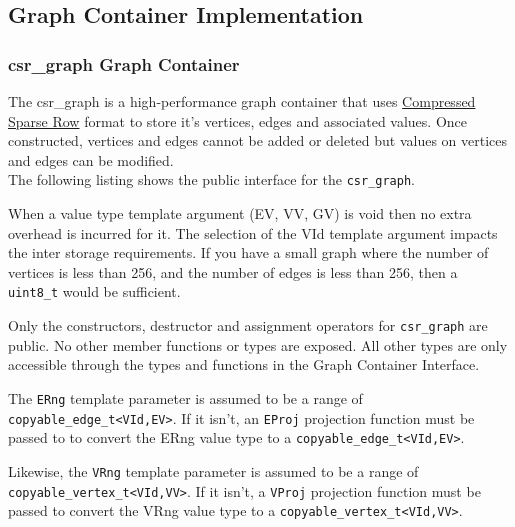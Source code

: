 \documentclass[10pt,onecolumn]{article}
\newcommand{\tcode}[1]{\lstinline[breaklines=true]{#1}}
\begin{document}
\subsection{Graph Container Implementation}

\subsubsection{csr\_graph Graph Container}
The csr\_graph is a high-performance graph container that uses \href{https://en.wikipedia.org/wiki/Sparse_matrix#Compressed_sparse_row_\%28CSR\%2C_CRS_or_Yale_format\%29}{Compressed Sparse Row} format to store it's vertices, edges and associated values. Once constructed, vertices and edges cannot be added or deleted but values on vertices and edges can be modified.
\\

The following listing shows the public interface for the \tcode{csr_graph}. 

When a value type template argument (EV, VV, GV) is void then no extra overhead is incurred for it. The selection of the VId template argument impacts the inter storage requirements. If you have a small graph where the number of vertices is less than 256, and the number of edges is less than 256, then a \tcode{uint8_t} would be sufficient.

Only the constructors, destructor and assignment operators for \tcode{csr_graph} are public. No other member functions or types are exposed. All other types are only accessible through the types and functions in the Graph Container Interface.

The \tcode{ERng} template parameter is assumed to be a range of \tcode{copyable_edge_t<VId,EV>}. If it isn't, an \tcode{EProj} projection function must be passed to to convert the ERng value type to a \tcode{copyable_edge_t<VId,EV>}.

Likewise, the \tcode{VRng} template parameter is assumed to be a range of \tcode{copyable_vertex_t<VId,VV>}. If it isn't, a \tcode{VProj} projection function must be passed to convert the VRng value type to a \tcode{copyable_vertex_t<VId,VV>}.
\end{document}

